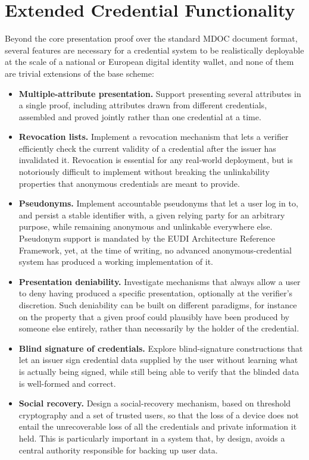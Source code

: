 \documentclass[binding=0.6cm,oneside,noexaminfo]{sapthesis}
\begin{document}
\section{Extended Credential Functionality}

Beyond the core presentation proof over the standard MDOC document format, several features are necessary for a credential system to be realistically deployable at the scale of a national or European digital identity wallet, and none of them are trivial extensions of the base scheme:

\begin{itemize}
    \item \textbf{Multiple-attribute presentation.} Support presenting several attributes in a single proof, including attributes drawn from different credentials, assembled and proved jointly rather than one credential at a time.
    \item \textbf{Revocation lists.} Implement a revocation mechanism that lets a verifier efficiently check the current validity of a credential after the issuer has invalidated it. Revocation is essential for any real-world deployment, but is notoriously difficult to implement without breaking the unlinkability properties that anonymous credentials are meant to provide.
    \item \textbf{Pseudonyms.} Implement accountable pseudonyms that let a user log in to, and persist a stable identifier with, a given relying party for an arbitrary purpose, while remaining anonymous and unlinkable everywhere else. Pseudonym support is mandated by the EUDI Architecture Reference Framework, yet, at the time of writing, no advanced anonymous-credential system has produced a working implementation of it.
    \item \textbf{Presentation deniability.} Investigate mechanisms that always allow a user to deny having produced a specific presentation, optionally at the verifier's discretion. Such deniability can be built on different paradigms, for instance on the property that a given proof could plausibly have been produced by someone else entirely, rather than necessarily by the holder of the credential.
    \item \textbf{Blind signature of credentials.} Explore blind-signature constructions that let an issuer sign credential data supplied by the user without learning what is actually being signed, while still being able to verify that the blinded data is well-formed and correct.
    \item \textbf{Social recovery.} Design a social-recovery mechanism, based on threshold cryptography and a set of trusted users, so that the loss of a device does not entail the unrecoverable loss of all the credentials and private information it held. This is particularly important in a system that, by design, avoids a central authority responsible for backing up user data.
\end{itemize}
\end{document}
